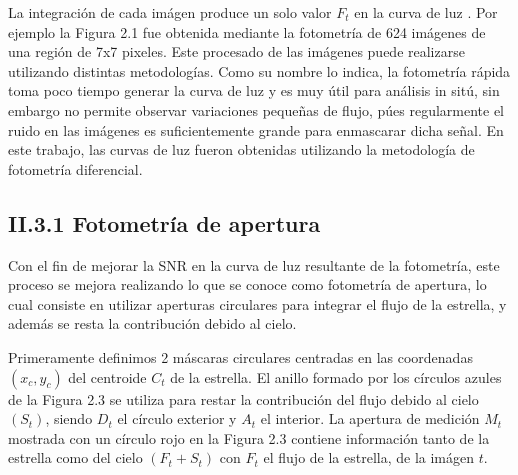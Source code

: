 La integración de cada imágen produce un solo valor $F_{t}$ en la curva de luz \cite{romanishin2006introduction}. Por ejemplo la Figura 2.1 fue obtenida mediante la fotometría de 624 imágenes de una región de 7x7 pixeles. Este procesado de las imágenes puede realizarse utilizando distintas metodologías. Como su nombre lo indica, la fotometría rápida toma poco tiempo generar la curva de luz y es muy útil para análisis in sitú, sin embargo no permite observar variaciones pequeñas de flujo, púes regularmente el ruido en las imágenes es suficientemente grande para enmascarar dicha señal. En este trabajo, las curvas de luz fueron obtenidas utilizando la metodología de fotometría diferencial.

\subsection*{II.3.1 Fotometría de apertura}

Con el fin de mejorar la SNR en la curva de luz resultante de la fotometría, este proceso se mejora realizando lo que se conoce como fotometría de apertura, lo cual consiste en utilizar aperturas circulares para integrar el flujo de la estrella, y además se resta la contribución debido al cielo.

Primeramente definimos 2 máscaras circulares centradas en las coordenadas $(x_{c},y_{c})$ del centroide $ C_{t} $ de la estrella. El anillo formado por los círculos azules de la Figura 2.3 se utiliza para restar la contribución del flujo debido al cielo $(S_{t})$, siendo $D_{t}$ el círculo exterior y $A_{t}$ el interior. La apertura de medición $M_{t}$ mostrada con un círculo rojo en la Figura 2.3 contiene información tanto de la estrella como del cielo $(F_{t}+S_{t})$ con $F_{t}$ el flujo de la estrella, de la imágen $t$.


